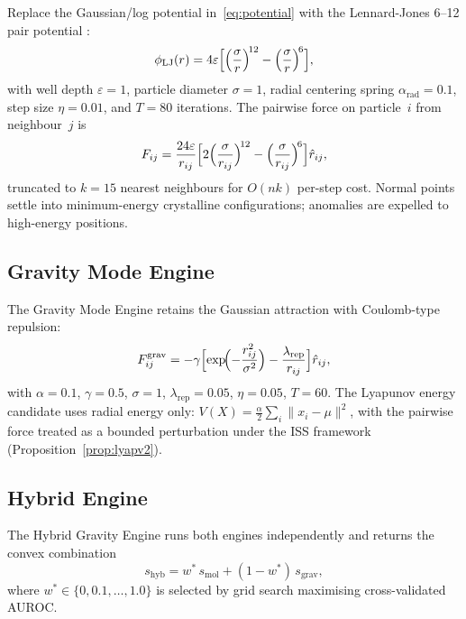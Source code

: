 \documentclass[final]{siamltex}
\newcommand{\norm}[1]{\lVert #1 \rVert}
\begin{document}
Replace the Gaussian/log potential in~\eqref{eq:potential} with the
Lennard-Jones 6--12 pair potential \cite{jones1924lj}:
\begin{equation}\label{eq:lj}
  \phi_{\mathrm{LJ}}(r) = 4\varepsilon\Bigl[
  \Bigl(\frac{\sigma}{r}\Bigr)^{\!12}
  - \Bigl(\frac{\sigma}{r}\Bigr)^{\!6}\Bigr],
\end{equation}
with well depth $\varepsilon=1$, particle diameter $\sigma=1$,
radial centering spring $\alpha_{\mathrm{rad}}=0.1$, step size
$\eta=0.01$, and $T=80$ iterations.  The pairwise force on
particle~$i$ from neighbour~$j$ is
\begin{equation}\label{eq:ljforce}
  F_{ij} = \frac{24\varepsilon}{r_{ij}}\Bigl[
  2\Bigl(\frac{\sigma}{r_{ij}}\Bigr)^{\!12}
  - \Bigl(\frac{\sigma}{r_{ij}}\Bigr)^{\!6}\Bigr]\hat{r}_{ij},
\end{equation}
truncated to $k=15$ nearest neighbours for $O(nk)$ per-step cost.
Normal points settle into minimum-energy crystalline configurations;
anomalies are expelled to high-energy positions.

\subsection{Gravity Mode Engine}\label{sec:gravity_mode}

The Gravity Mode Engine retains the Gaussian attraction
with Coulomb-type repulsion:
\begin{equation}\label{eq:gravforce}
  F_{ij}^{\mathrm{grav}} = -\gamma\Bigl[
  \exp\!\Bigl(-\frac{r_{ij}^2}{\sigma^2}\Bigr)
  - \frac{\lambda_{\mathrm{rep}}}{r_{ij}}\Bigr]\hat{r}_{ij},
\end{equation}
with $\alpha=0.1$, $\gamma=0.5$, $\sigma=1$,
$\lambda_{\mathrm{rep}}=0.05$, $\eta=0.05$, $T=60$.
The Lyapunov energy candidate uses radial energy only:
$V(X) = \tfrac{\alpha}{2}\sum_i\norm{x_i - \mu}^2$,
with the pairwise force treated as a bounded perturbation under
the ISS framework (Proposition~\ref{prop:lyapv2}).

\subsection{Hybrid Engine}\label{sec:hybrid}

The Hybrid Gravity Engine runs both engines independently and
returns the convex combination
\begin{equation}\label{eq:hybrid}
  s_{\mathrm{hyb}} = w^*\,s_{\mathrm{mol}}
  + (1 - w^*)\,s_{\mathrm{grav}},
\end{equation}
where $w^*\in\{0,0.1,\ldots,1.0\}$ is selected by grid search
maximising cross-validated AUROC.
\end{document}
